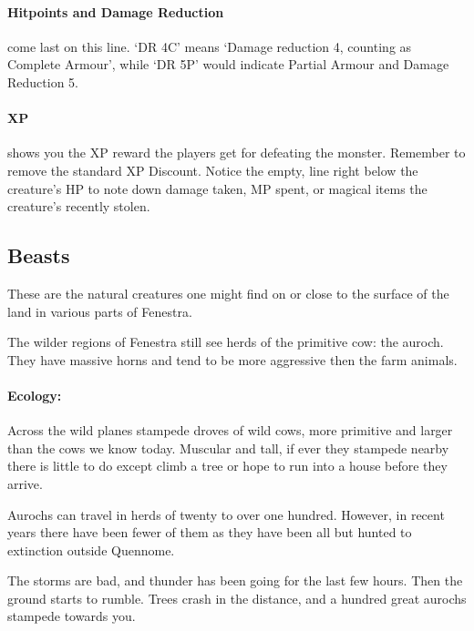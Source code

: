 \begin{multicols}{2}
\paragraph{Hitpoints and Damage Reduction} come last on this line.  `DR 4C' means `Damage reduction 4, counting as Complete Armour', while `DR 5P' would indicate Partial Armour and Damage Reduction 5.

\paragraph{XP} shows you the XP reward the players get for defeating the monster.  Remember to remove the standard XP Discount.  Notice the empty, line right below the creature's HP to note down damage taken, MP spent, or magical items the creature's recently stolen.

\subsection{Beasts}

These are the natural creatures one might find on or close to the surface of the land in various parts of Fenestra.

\label{auroch}

The wilder regions of Fenestra still see herds of the primitive cow: the auroch.
They have massive horns and tend to be more aggressive then the farm animals.


\paragraph{Ecology:} Across the wild planes stampede droves of wild cows, more primitive and larger than the cows we know today.  Muscular and tall, if ever they stampede nearby there is little to do except climb a tree or hope to run into a house before they arrive.

Aurochs can travel in herds of twenty to over one hundred.  However, in recent years there have been fewer of them as they have been all but hunted to extinction outside Quennome.

\begin{boxtext}

	The storms are bad, and thunder has been going for the last few hours.  Then the ground starts to rumble.  Trees crash in the distance, and a hundred great aurochs stampede towards you.


\end{boxtext}
\end{multicols}
